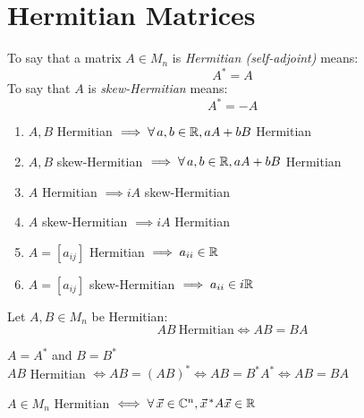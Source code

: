 \documentclass[letterpaper,12pt,fleqn]{article}
\newcommand{\vx}{\vec{x}}
\newcommand{\vxct}{\vx^{\,*}}
\begin{document}
\section*{Hermitian Matrices}

\begin{definition}[Hermitian]
  To say that a matrix $A\in M_n$ is \emph{Hermitian (self-adjoint)} means:
  \[A^*=A\]
  To say that $A$ is \emph{skew-Hermitian} means:
  \[A^*=-A\]
\end{definition}

\begin{properties}[Hermitian]
  \listbreak
  \begin{enumerate}
  \item $A,B$ Hermitian $\implies \forall\,a,b\in\mathbb{R},aA+bB$ Hermitian
  \item $A,B$ skew-Hermitian $\implies \forall\,a,b\in\mathbb{R},aA+bB$ Hermitian
  \item $A$ Hermitian $\implies iA$ skew-Hermitian
  \item $A$ skew-Hermitian $\implies iA$ Hermitian
  \item $A=[a_{ij}]$ Hermitian $\implies a_{ii}\in\mathbb{R}$
  \item $A=[a_{ij}]$ skew-Hermitian $\implies a_{ii}\in i\mathbb{R}$
  \end{enumerate}
\end{properties}

\begin{theorem}
  Let $A,B\in M_n$ be Hermitian:
  \[AB\ \mbox{Hermitian} \iff AB=BA\]
\end{theorem}

\begin{theproof}
  $A=A^*$ and $B=B^*$ \\
  $AB$ Hermitian $\iff AB=(AB)^* \iff AB=B^*A^* \iff AB=BA$
\end{theproof}

\begin{theorem}
  $A\in M_n$ Hermitian $\iff \forall\,\vx\in\C^n,\vxct A\vx\in\R$
\end{theorem}
\end{document}
